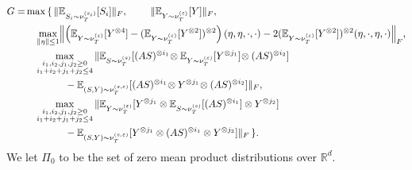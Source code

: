 \documentclass{article} %
\newcommand{\real}{\mathbb{R}}
\newcommand{\E}{\mathbb{E}}
\renewcommand{\epsilon}{\varepsilon}
\theoremstyle{definition}
\begin{document}
\begin{align*}
G = &  \max \Huge{\{} \, \| \E_{S_i\sim \nu_T^{(s_i)}} [S_i] \|_F,\quad \| \E_{Y \sim \nu_T^{(\epsilon)}} [Y] \|_F, \\
& \quad  \max_{\|\eta\| \le 1} \Bigl\| \left(\E_{Y\sim \nu_T^{(\epsilon)}} [Y^{\otimes4}] - (\E_{Y\sim \nu_T^{(\epsilon)}} [Y^{\otimes2}])^{\otimes 2}\right)(\eta,\eta,\cdot,\cdot)  - 2 (\E_{Y\sim \nu_T^{(\epsilon)}} [Y^{\otimes2}])^{\otimes 2}(\eta,\cdot,\eta,\cdot)\Bigr\|_F, \\
& \quad \max_{
	\substack{i_1,i_2,j_1,j_2 \ge 0 \\ i_1+i_2+j_1+j_2 \le 4}}
 \| \E_{S\sim \nu_T^{(s)}} [(AS)^{\otimes i_1}\!\otimes \E_{Y\sim \nu_T^{(\epsilon)}} [Y^{\otimes j_1}] \!\otimes (AS)^{\otimes i_2}] \\
& \quad \quad \quad \quad - \E_{(S, Y)\sim \nu_T^{(s, \epsilon)}} [(AS)^{\otimes i_1}\!\otimes Y^{\otimes j_1}\!\otimes (AS)^{\otimes i_2}]  \|_F, \\
& \quad \max_{
	\substack{i_1,i_2,j_1,j_2 \ge 0 \\ i_1+i_2+j_1+j_2 \le 4}}
\| \E_{Y\sim \nu_T^{(\epsilon)}} [Y^{\otimes j_1} \otimes \E_{S\sim \nu_T^{(s)}} [(AS)^{\otimes i_1}] \otimes Y^{\otimes j_2}] \\
& \quad \quad \quad \quad - \E_{(S, Y)\sim \nu_T^{(s, \epsilon)}} [ Y^{\otimes j_1}\otimes (AS)^{\otimes i_1}\otimes Y^{\otimes j_2}] \|_F \, \Huge{\}}.
\end{align*}
\fi
We let $\Pi_0$ to be the set of zero mean product distributions over $\real^d$.
\end{document}
